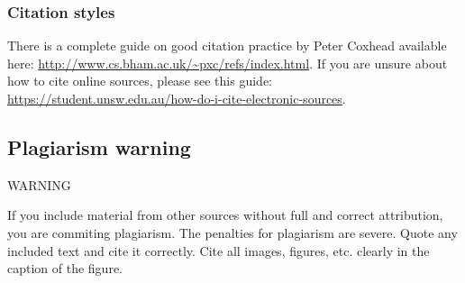 \documentclass{l4proj}
\begin{document}
\subsubsection{Citation styles}


There is a complete guide on good citation practice by Peter Coxhead available here: \url{http://www.cs.bham.ac.uk/~pxc/refs/index.html}. 
If you are unsure about how to cite online sources, please see this guide: \url{https://student.unsw.edu.au/how-do-i-cite-electronic-sources}.

\subsection{Plagiarism warning}

\begin{highlight_title}{WARNING}
    
    If you include material from other sources without full and correct attribution, you are commiting plagiarism. The penalties for plagiarism are severe.
    Quote any included text and cite it correctly. Cite all images, figures, etc. clearly in the caption of the figure.
\end{highlight_title}


\end{document}
